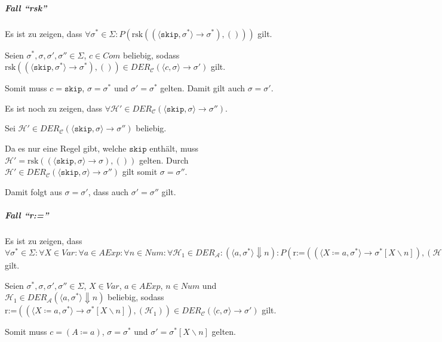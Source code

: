 				\subparagraph{Fall \enquote{rsk}}
					Es ist zu zeigen, dass $ \forall \sigma ^ * \in \Sigma : P(\text{rsk}((\langle \texttt{skip}, \sigma ^ * \rangle \rightarrow \sigma ^ *), ())) $ gilt.

					Seien $ \sigma ^ *, \sigma, \sigma', \sigma'' \in \Sigma $, $ c \in \textit{Com} $ beliebig, sodass $ \text{rsk}((\langle \texttt{skip}, \sigma ^ * \rangle \rightarrow \sigma ^ *), ()) \in \textit{DER} _ \mathcal{C} (\langle c, \sigma \rangle \rightarrow \sigma') $ gilt.

					Somit muss $ c = \texttt{skip} $, $ \sigma = \sigma ^ * $ und $ \sigma' = \sigma ^ * $ gelten. Damit gilt auch $ \sigma = \sigma' $.

					Es ist noch zu zeigen, dass $ \forall \mathcal{H}' \in \textit{DER} _ \mathcal{C} (\langle \texttt{skip}, \sigma \rangle \rightarrow \sigma'') $.

					Sei $ \mathcal{H}' \in \textit{DER} _ \mathcal{C} (\langle \texttt{skip}, \sigma \rangle \rightarrow \sigma'') $ beliebig.

					Da es nur eine Regel gibt, welche $ \texttt{skip} $ enthält, muss $ \mathcal{H}' = \text{rsk}((\langle \texttt{skip}, \sigma \rangle \rightarrow \sigma), ()) $ gelten. Durch $ \mathcal{H}' \in \textit{DER} _ \mathcal{C} (\langle \texttt{skip}, \sigma \rangle \rightarrow \sigma'') $ gilt somit $ \sigma = \sigma'' $.

					Damit folgt aus $ \sigma = \sigma' $, dass auch $ \sigma' = \sigma'' $ gilt.

				\subparagraph{Fall \enquote{r:=}}
					Es ist zu zeigen, dass $ \forall \sigma ^ * \in \Sigma : \forall X \in \textit{Var} : \forall a \in \textit{AExp} : \forall n \in \textit{Num} : \forall \mathcal{H} _ 1 \in \textit{DER} _ \mathcal{A} : (\langle a, \sigma ^ * \rangle \Downarrow n) : P(\text{r:=}((\langle X \coloneqq a, \sigma ^ * \rangle \rightarrow \sigma ^ * [X \backslash n]), (\mathcal{H} _ 1))) $ gilt.

					Seien $ \sigma ^ *, \sigma, \sigma', \sigma'' \in \Sigma $, $ X \in \textit{Var} $, $ a \in \textit{AExp} $, $ n \in \textit{Num} $ und $ \mathcal{H} _ 1 \in \textit{DER} _ \mathcal{A} (\langle a, \sigma ^ * \rangle \Downarrow n) $ beliebig, sodass $ \text{r:=}((\langle X \coloneqq a, \sigma ^ * \rangle \rightarrow \sigma ^ * [X \backslash n]), (\mathcal{H} _ 1)) \in \textit{DER} _ \mathcal{C} (\langle c, \sigma \rangle \rightarrow \sigma') $ gilt.

					Somit muss $ c = (A \coloneqq a) $, $ \sigma = \sigma ^ * $ und $ \sigma' = \sigma ^ * [X \backslash n] $ gelten.

